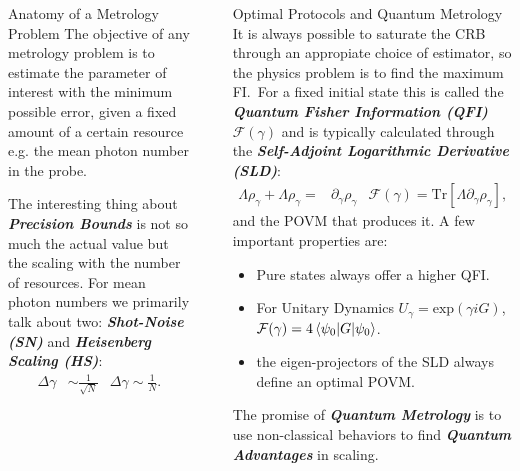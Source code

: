 \documentclass[final]{beamer}
\newlength{\sepwidth}
\newlength{\colwidth}
\newcommand{\separatorcolumn}{\begin{column}{\sepwidth}\end{column}}
\begin{document}
\begin{frame}[t]
\begin{columns}[t]
\begin{column}{\colwidth}
 \begin{block}{Anatomy of a Metrology Problem}
   The objective of any metrology problem is to estimate the parameter of interest with the minimum possible error, given a fixed amount of a
   certain resource e.g. the mean photon number in the probe.
   \vspace{-0.07\linewidth}
   
   \vspace{-0.11\linewidth}
   The interesting thing about  \textbf{\textit{Precision Bounds}} is not so much the actual value but the scaling with the number of resources.
   For mean photon numbers we primarily talk about two: \textbf{\textit{Shot-Noise (SN)}} and \textbf{\textit{Heisenberg Scaling (HS)}}:
 {\Large
  \begin{align*}
    \Delta \gamma &\sim \frac{1}{\sqrt{N}} & \Delta \gamma \sim \frac{1}{N}.
  \end{align*}
}
 \end{block}
\end{column}
\separatorcolumn

\begin{column}{\colwidth}


\begin{block}{Optimal Protocols and Quantum Metrology}
  It is always possible to saturate the CRB through an appropiate choice of estimator, so the physics problem is to find the maximum
  FI.\ For a fixed initial state this is called the \textit{\textbf{Quantum Fisher Information (QFI)}} $\mathcal{F}(\gamma)$
  and is typically calculated through the \textit{\textbf{Self-Adjoint Logarithmic Derivative (SLD)}}:
  {\Large
  \begin{align*}
    \Lambda \rho_{\gamma} + \Lambda \rho_{\gamma} =& \partial_{\gamma} \rho_{\gamma} & \mathcal{F}(\gamma) = \mathrm{Tr}[\Lambda \partial_{\gamma}\rho_{\gamma}],
  \end{align*}
}
and the POVM that produces it. A few important properties are:
\begin{itemize}
        \item Pure states always offer a higher QFI.
        \item For Unitary Dynamics $U_{\gamma}=\mathrm{exp}({\gamma iG})$, $\mathcal{F}(\gamma)=4\braket{\psi_{0} | G | \psi_{0}}$.
        \item the eigen-projectors of the SLD always define an optimal POVM.
\end{itemize}
The promise of \textbf{\textit{Quantum Metrology}} is to use non-classical behaviors to find \textit{\textbf{Quantum Advantages}} in scaling.
\end{block}



\end{column}
\end{columns}
\end{frame}
\end{document}
